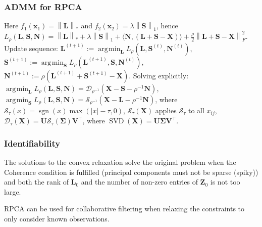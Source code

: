 \documentclass[11pt,a4paper,technote]{IEEEtran}
\DeclareMathOperator*{\argmin}{\arg\!\min}
\newcommand{\abs}[1]{\left\lvert#1\right\rvert}
\newcommand{\norm}[1]{\left\lVert#1\right\rVert}
\newcommand{\inner}[2]{\langle#1,#2\rangle}
\newcommand{\matr}[1]{\boldsymbol{\mathbf{#1}}}
\newcommand{\vect}[1]{\boldsymbol{\mathbf{#1}}}
\newcommand{\trns}[1]{#1^{\top}}
\DeclareMathOperator{\sgn}{sgn}
\DeclareMathOperator{\SVD}{SVD}
\begin{document}
\subsubsection*{ADMM for RPCA}
Here $f_1(\vect{x}_1) = \norm{\matr{L}}_*$ and $f_2(\vect{x}_2) = \lambda
\norm{\matr{S}}_1$, hence $L_{\rho}(\matr{L},\matr{S},\matr{N}) =
\norm{\matr{L}}_* + \lambda\norm{\matr{S}}_1 + \inner{\matr{N}}{(\matr{L} +
  \matr{S} - \matr{X})} + \frac{\rho}{2}\norm{\matr{L} + \matr{S} -
  \matr{X}}_F^2$. Update sequence:
$\matr{L}^{(t+1)}:=\argmin_{\matr{L}}L_{\rho}(\matr{L},\matr{S}^{(t)},\matr{N}^{(t)})$,
$\matr{S}^{(t+1)}:=\argmin_{\matr{S}}L_{\rho}(\matr{L}^{(t+1)},\matr{S},\matr{N}^{(t)})$,
$\matr{N}^{(t+1)}:=\rho(\matr{L}^{(t+1)} + \matr{S}^{(t+1)} - \matr{X})$.
Solving explicitly:
$\argmin_{\matr{L}}L_{\rho}(\matr{L},\matr{S},\matr{N}) = \mathcal{D}_{\rho^{-1}}
(\matr{X} - \matr{S} - \rho^{-1}\matr{N})$,
$\argmin_{\matr{S}}L_{\rho}(\matr{L},\matr{S},\matr{N}) = \mathcal{S}_{\rho^{-1}}
(\matr{X} - \matr{L} - \rho^{-1}\matr{N})$, where $\mathcal{S}_{\tau}(x) =
\sgn(x)\max(\abs{x}-\tau, 0)$, $\mathcal{S}_{\tau}(\matr{X})$ applies
$\mathcal{S}_{\tau}$ to all $x_{ij}$, $\mathcal{D}_{\tau}(\matr{X}) = \matr{U}
\mathcal{S}_{\tau}(\matr{\Sigma})\trns{\matr{V}}$, where $\SVD(\matr{X}) =
\matr{U}\matr{\Sigma}\trns{\matr{V}}$.

\subsubsection*{Identifiability}
The solutions to the convex relaxation solve the original problem when the Coherence
condition is fulfilled (principal components must not be sparse (spiky)) and
both the rank of $\matr{L}_0$ and the number of non-zero entries of $\matr{Z}_0$
is not too large.

RPCA can be used for collaborative filtering when relaxing the constraints to
only consider known observations.
\end{document}
